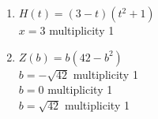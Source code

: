 \documentclass{ximera}
\begin{document}
\begin{multicols}{2}
\begin{enumerate}
\setcounter{enumi}{\value{HW}}

\item $H(t) = (3-t)\left(t^2+1\right)$\\
$x =3$ multiplicity 1\\


\vfill

\columnbreak

\item $Z(b) = b(42 - b^{2})$\\
$b = -\sqrt{42}$ multiplicity 1\\
$b = 0$ multiplicity 1\\
$b = \sqrt{42}$ multiplicity 1\\


\setcounter{HW}{\value{enumi}}
\end{enumerate}
\end{multicols}

\pagebreak
\end{document}
